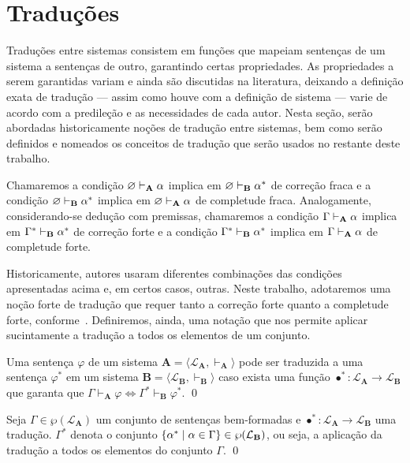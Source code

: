 \section{Traduções}

Traduções entre sistemas consistem em funções que mapeiam sentenças de um sistema a sentenças de outro, garantindo certas propriedades. As propriedades a serem garantidas variam e ainda são discutidas na literatura, deixando a definição exata de tradução --- assim como houve com a definição de sistema --- varie de acordo com a predileção e as necessidades de cada autor. Nesta seção, serão abordadas historicamente noções de tradução entre sistemas, bem como serão definidos e nomeados os conceitos de tradução que serão usados no restante deste trabalho.

\begin{definition}[Condições]
    Chamaremos a condição $\varnothing\mathrel{\vdash}_\mathbf{A}\alpha$ implica em $\varnothing\mathrel{\vdash}_\mathbf{B}\alpha^*$ de correção fraca e a condição $\varnothing\mathrel{\vdash}_\mathbf{B}\alpha^*$ implica em $\varnothing\mathrel{\vdash}_\mathbf{A}\alpha$ de completude fraca. Analogamente, considerando-se dedução com premissas, chamaremos a condição $\Gamma\mathrel{\vdash}_\mathbf{A}\alpha$ implica em $\Gamma^*\mathrel{\vdash}_\mathbf{B}\alpha^*$ de correção forte e a condição $\Gamma^*\mathrel{\vdash}_\mathbf{B}\alpha^*$ implica em $\Gamma\mathrel{\vdash}_\mathbf{A}\alpha$ de completude forte.
\end{definition}

Historicamente, autores usaram diferentes combinações das condições apresentadas acima e, em certos casos, outras. Neste trabalho, adotaremos uma noção forte de tradução que requer tanto a correção forte quanto a completude forte, conforme~\cite{Coniglio}. Definiremos, ainda, uma notação que nos permite aplicar sucintamente a tradução a todos os elementos de um conjunto.

\begin{definition}[Tradução] 
    Uma sentença $\varphi$ de um sistema $\mathbf{A} = \langle \mathcal{L}_\mathbf{A}, \vdash_\mathbf{A}\rangle$ pode ser traduzida a uma sentença $\varphi^*$ em um sistema $\mathbf{B} = \langle \mathcal{L}_\mathbf{B}, \vdash_\mathbf{B} \rangle$ caso exista uma função $\bullet^* : \mathcal{L}_\mathbf{A} \to \mathcal{L}_\mathbf{B}$ que garanta que $\Gamma \vdash_\mathbf{A} \varphi \Leftrightarrow \Gamma^* \vdash_\mathbf{B} \varphi^*$.
    \qed{}
\end{definition}

\begin{notation}
    Seja $\Gamma\in\wp(\mathcal{L}_\mathbf{A})$ um conjunto de sentenças bem-formadas e $\bullet^*\mathrel{:}\mathcal{L}_\mathbf{A}\to\mathcal{L}_\mathbf{B}$ uma tradução. $\Gamma^*$ denota o conjunto $\left\{\alpha^*\mid\alpha\in\Gamma\right\}\in\wp(\mathcal{L}_\mathbf{B})$, ou seja, a aplicação da tradução a todos os elementos do conjunto $\Gamma$.
    \qed{}
\end{notation}

